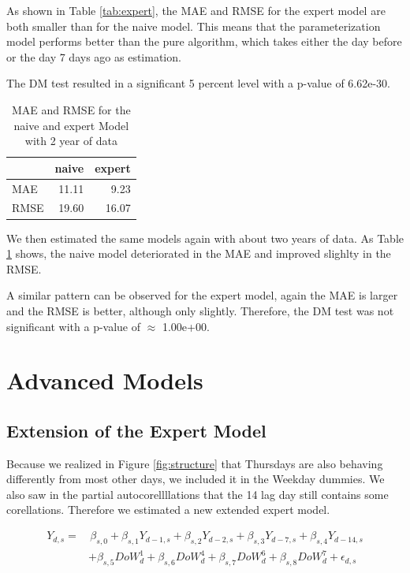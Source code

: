 \documentclass[12pt,a4paper]{article}
\begin{document}
As shown in Table \ref{tab:expert}, the \ac{MAE} and \ac{RMSE} for the
expert model are both smaller than for the naive model. This means that
the parameterization model performs better than the pure algorithm,
which takes either the day before or the day 7 days ago as estimation.

The \ac{DM} test resulted in a significant 5 percent level with a
p-value of 6.62e-30.

\begin{table}[!h]

\caption{\label{tab:expert model 2 years}\label{tab:expert_2} MAE and RMSE for the naive and expert Model with 2 year of data}
\centering
\begin{tabular}{lrr}
\toprule
  & naive & expert\\
\midrule
\rowcolor{gray!6}  MAE & 11.11 & 9.23\\
RMSE & 19.60 & 16.07\\
\bottomrule
\end{tabular}
\end{table}

We then estimated the same models again with about two years of data. As
Table \ref{tab:expert_2} shows, the naive model deteriorated in the
\ac{MAE} and improved slighlty in the \ac{RMSE}.

A similar pattern can be observed for the expert model, again the
\ac{MAE} is larger and the \ac{RMSE} is better, although only slightly.
Therefore, the \ac{DM} test was not significant with a p-value of
\(\approx\) 1.00e+00.

\hypertarget{advanced-models}{%
\section{Advanced Models}\label{advanced-models}}

\hypertarget{extension-of-the-expert-model}{%
\subsection{Extension of the Expert
Model}\label{extension-of-the-expert-model}}

Because we realized in Figure \ref{fig:structure} that Thursdays are
also behaving differently from most other days, we included it in the
Weekday dummies. We also saw in the partial autocorellllations that the
14 lag day still contains some corellations. Therefore we estimated a
new extended expert model.

\begin{align*}
 Y_{d,s} = &  \, \beta_{s,0 } + \beta_{s,1 } Y_{ d-1,s} + \beta_{s,2 } Y_{ d-2,s} + \beta_{s,3 } Y_{ d-7,s}  + \beta_{s,4 } Y_{ d-14,s} \\ 
  & + \beta_{s,5 } DoW^1_{d}   + \beta_{s,6 } DoW^4_{d}  + \beta_{s,7 } DoW^6_{d} +\beta_{s,8 } DoW^7_{d} + \epsilon_{d,s}
\end{align*}
\end{document}
